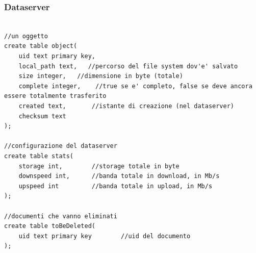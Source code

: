 \documentclass[11pt,a4paper,english]{article}
\begin{document}
\subsubsection{Dataserver}

\begin{lstlisting}[title=Struttura]

//un oggetto
create table object(
    uid text primary key,
    local_path text,   //percorso del file system dov'e' salvato
    size integer,   //dimensione in byte (totale)
    complete integer,    //true se e' completo, false se deve ancora essere totalmente trasferito
    created text,       //istante di creazione (nel dataserver)
    checksum text
);

//configurazione del dataserver
create table stats(
    storage int,        //storage totale in byte
    downspeed int,      //banda totale in download, in Mb/s
    upspeed int         //banda totale in upload, in Mb/s 
);

//documenti che vanno eliminati
create table toBeDeleted(
    uid text primary key        //uid del documento
);


\end{lstlisting}
\end{document}
